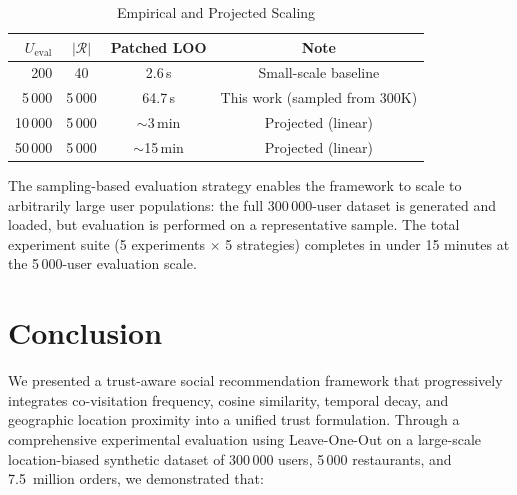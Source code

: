 \documentclass[conference]{IEEEtran}
\begin{document}
\begin{table}[h]
\centering
\caption{Empirical and Projected Scaling}
\label{tab:scaling}
\begin{tabular}{rccc}
\toprule
$U_{\text{eval}}$ & \textbf{$|\mathcal{R}|$} & \textbf{Patched LOO} & \textbf{Note} \\
\midrule
200      & 40     & 2.6\,s     & Small-scale baseline \\
5\,000   & 5\,000 & 64.7\,s    & This work (sampled from 300K) \\
10\,000  & 5\,000 & $\sim$3\,min  & Projected (linear) \\
50\,000  & 5\,000 & $\sim$15\,min & Projected (linear) \\
\bottomrule
\end{tabular}
\end{table}

The sampling-based evaluation strategy enables the framework to scale
to arbitrarily large user populations: the full 300\,000-user dataset is
generated and loaded, but evaluation is performed on a representative
sample.  The total experiment suite (5 experiments $\times$ 5 strategies)
completes in under 15 minutes at the 5\,000-user evaluation scale.


\section{Conclusion}
\label{sec:conclusion}

We presented a trust-aware social recommendation framework that
progressively integrates co-visitation frequency, cosine similarity,
temporal decay, and geographic location proximity into a unified trust
formulation.  Through a comprehensive experimental evaluation using
Leave-One-Out on a large-scale location-biased synthetic dataset of
300\,000 users, 5\,000 restaurants, and 7.5~million orders, we
demonstrated that:
\end{document}
